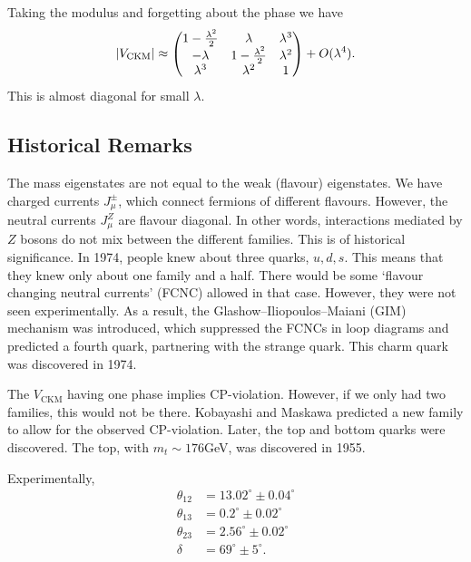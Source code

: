 
Taking the modulus and forgetting about the phase we have
\begin{equation}
  \abs{V_{\text{CKM}}} \approx
  \begin{pmatrix}
   1 - \frac{\lambda^2}{2} & \lambda & \lambda^3 \\
   -\lambda & 1-\frac{\lambda^2}{2} & \lambda^2 \\
   \lambda^3 & \lambda^2 & 1 \\
 \end{pmatrix} + O(\lambda^4).
\end{equation}
This is almost diagonal for small $\lambda$.

\subsection*{Historical Remarks}%

The mass eigenstates are not equal to the weak (flavour) eigenstates.
We have charged currents $J_{\mu}^{\pm}$, which connect fermions of different flavours.
However, the neutral currents $J_{\mu}^Z$ are flavour diagonal. In other words, interactions mediated by $Z$ bosons do not mix between the different families.
This is of historical significance. In 1974, people knew about three quarks, $u, d, s$. This means that they knew only about one family and a half. There would be some `flavour changing neutral currents' (FCNC) allowed in that case. However, they were not seen experimentally. As a result, the Glashow--Iliopoulos--Maiani (GIM) mechanism was introduced, which suppressed the FCNCs in loop diagrams and predicted a fourth quark, partnering with the strange quark. This charm quark was discovered in 1974.

The $V_{\text{CKM}}$ having one phase implies CP-violation. However, if we only had two families, this would not be there. Kobayashi and Maskawa predicted a new family to allow for the observed CP-violation.
Later, the top and bottom quarks were discovered. The top, with $m_t \sim 176$GeV, was discovered in 1955.

Experimentally, 
\begin{align}
  \theta_{12} &= 13.02^\circ \pm 0.04^\circ \\
  \theta_{13} &= 0.2^\circ \pm 0.02^\circ \\
  \theta_{23} &= 2.56^\circ \pm 0.02^\circ \\
  \delta &= 69^\circ \pm 5^\circ.
\end{align}

